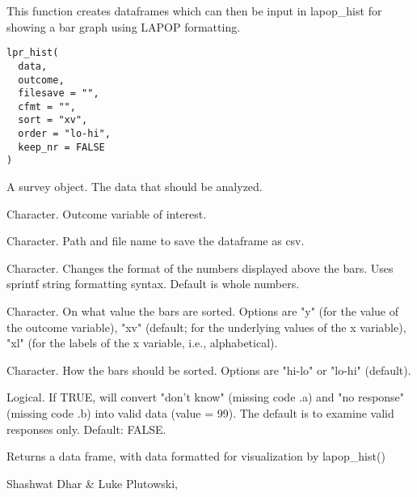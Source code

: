 \documentclass[a4paper]{book}
\begin{document}
%
\begin{Description}
This function creates dataframes which can then be input in lapop\_hist for
showing a bar graph using LAPOP formatting.
\end{Description}
%
\begin{Usage}
\begin{verbatim}
lpr_hist(
  data,
  outcome,
  filesave = "",
  cfmt = "",
  sort = "xv",
  order = "lo-hi",
  keep_nr = FALSE
)
\end{verbatim}
\end{Usage}
%
\begin{Arguments}
\begin{ldescription}
\item[\code{data}] A survey object.  The data that should be analyzed.

\item[\code{outcome}] Character. Outcome variable of interest.

\item[\code{filesave}] Character.  Path and file name to save the dataframe as csv.

\item[\code{cfmt}] Character. Changes the format of the numbers displayed above the bars.
Uses sprintf string formatting syntax. Default is whole numbers.

\item[\code{sort}] Character. On what value the bars are sorted.
Options are "y" (for the value of the outcome variable), "xv" (default; for
the underlying values of the x variable), "xl" (for the labels of the x variable,
i.e., alphabetical).

\item[\code{order}] Character.  How the bars should be sorted.  Options are "hi-lo"
or "lo-hi" (default).

\item[\code{keep\_nr}] Logical.  If TRUE, will convert "don't know" (missing code .a)
and "no response" (missing code .b) into valid data (value = 99).
The default is to examine valid responses only.  Default: FALSE.
\end{ldescription}
\end{Arguments}
%
\begin{Value}
Returns a data frame, with data formatted for visualization by lapop\_hist()
\end{Value}
%
\begin{Author}
Shashwat Dhar  \&
Luke Plutowski, 
\end{Author}
\end{document}
